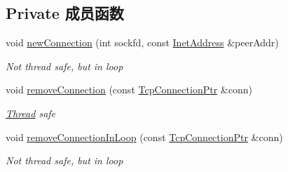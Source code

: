 \subsection*{Private 成员函数}
\begin{DoxyCompactItemize}
\item 
void \hyperlink{classmuduo_1_1TcpServer_a6e7510f45cfa67ddc79aa8689fd79562}{new\+Connection} (int sockfd, const \hyperlink{classmuduo_1_1InetAddress}{Inet\+Address} \&peer\+Addr)
\begin{DoxyCompactList}\small\item\em Not thread safe, but in loop \end{DoxyCompactList}\item 
void \hyperlink{classmuduo_1_1TcpServer_ad9661c3f05443256c9439f812d1a7691}{remove\+Connection} (const \hyperlink{namespacemuduo_a40c45128e9700d337d92f3cbb8dd4a0a}{Tcp\+Connection\+Ptr} \&conn)
\begin{DoxyCompactList}\small\item\em \hyperlink{classmuduo_1_1Thread}{Thread} safe \end{DoxyCompactList}\item 
void \hyperlink{classmuduo_1_1TcpServer_a38345725075c2bf845af025c2567d977}{remove\+Connection\+In\+Loop} (const \hyperlink{namespacemuduo_a40c45128e9700d337d92f3cbb8dd4a0a}{Tcp\+Connection\+Ptr} \&conn)
\begin{DoxyCompactList}\small\item\em Not thread safe, but in loop \end{DoxyCompactList}\end{DoxyCompactItemize}
